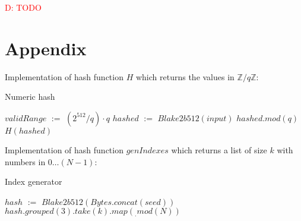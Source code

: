 \documentclass[]{article}
\newcommand{\dnote}[1]{\textcolor{red}{D: {#1}}}
\def\Let#1#2{\State #1 $:=$ #2}
\begin{document}


    \dnote{TODO}

    

    \section*{Appendix}
    \label{appendix}

    Implementation of hash function $H$ which returns the values in $\mathbb{Z}/q\mathbb{Z}$:

    \begin{algorithm}[H]
        \caption{Numeric hash}
        \label{alg:H}
        \begin{algorithmic}[1]
            \Let{$validRange$}{$(2^{512} / q) \cdot q$}
            \Let{$hashed$}{$Blake2b512(input)$}
            \State \Return $hashed.mod(q)$
            \Else
            \State \Return $H(hashed)$
            \EndIf
            \EndFunction
        \end{algorithmic}
    \end{algorithm}

    Implementation of hash function $genIndexes$ which returns a list of size $k$ with numbers in $0\dots (N-1)$:

    \begin{algorithm}[H]
        \caption{Index generator}
        \label{alg:genIndexes}
        \begin{algorithmic}[1]
            \Let{$hash$}{$Blake2b512(Bytes.concat(seed))$}
            \State \Return $hash.grouped(3).take(k).map(_.mod(N))$
            \EndFunction
        \end{algorithmic}
    \end{algorithm}
\end{document}
